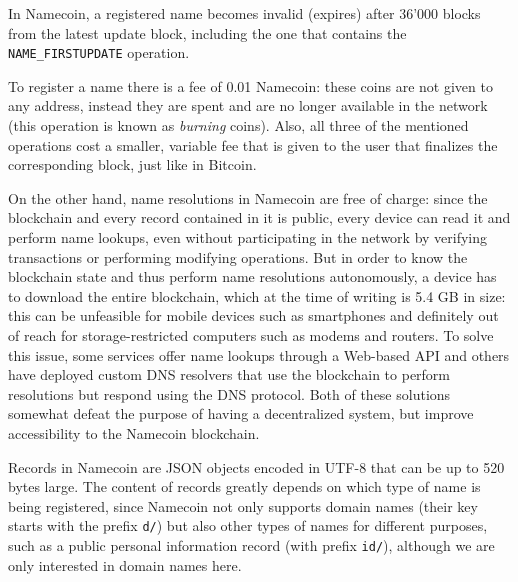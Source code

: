 \documentclass[mscthesis]{usiinfthesis}
\begin{document}
In Namecoin, a registered name becomes invalid (expires) after 36'000 blocks from the latest update block, including the one that contains the \texttt{NAME\_FIRSTUPDATE} operation.

To register a name there is a fee of 0.01 Namecoin: these coins are not given to any address, instead they are spent and are no longer available in the network (this operation is known as \emph{burning} coins). Also, all three of the mentioned operations cost a smaller, variable fee that is given to the user that finalizes the corresponding block, just like in Bitcoin.

On the other hand, name resolutions in Namecoin are free of charge: since the blockchain and every record contained in it is public, every device can read it and perform name lookups, even without participating in the network by verifying transactions or performing modifying operations. But in order to know the blockchain state and thus perform name resolutions autonomously, a device has to download the entire blockchain, which at the time of writing is 5.4 GB in size: this can be unfeasible for mobile devices such as smartphones and definitely out of reach for storage-restricted computers such as modems and routers. To solve this issue, some services offer name lookups through a Web-based API and others have deployed custom DNS resolvers that use the blockchain to perform resolutions but respond using the DNS protocol. Both of these solutions somewhat defeat the purpose of having a decentralized system, but improve accessibility to the Namecoin blockchain.

Records in Namecoin are JSON objects encoded in UTF-8 that can be up to 520 bytes large. The content of records greatly depends on which type of name is being registered, since Namecoin not only supports domain names (their key starts with the prefix \texttt{d/}) but also other types of names for different purposes, such as a public personal information record (with prefix \texttt{id/}), although we are only interested in domain names here.
\end{document}
